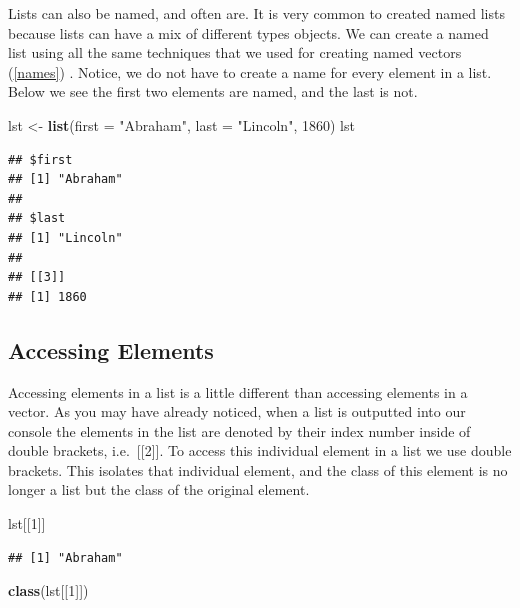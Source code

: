 \documentclass[
]{book}
\newenvironment{Shaded}{\begin{snugshade}}{\end{snugshade}}
\newcommand{\DataTypeTok}[1]{\textcolor[rgb]{0.13,0.29,0.53}{#1}}
\newcommand{\DecValTok}[1]{\textcolor[rgb]{0.00,0.00,0.81}{#1}}
\newcommand{\KeywordTok}[1]{\textcolor[rgb]{0.13,0.29,0.53}{\textbf{#1}}}
\newcommand{\NormalTok}[1]{#1}
\newcommand{\StringTok}[1]{\textcolor[rgb]{0.31,0.60,0.02}{#1}}
\begin{document}
Lists can also be named, and often are. It is very common to created named lists because lists can have a mix of different types objects. We can create a named list using all the same techniques that we used for creating named vectors (\ref{names}) . Notice, we do not have to create a name for every element in a list. Below we see the first two elements are named, and the last is not.

\begin{Shaded}
\begin{Highlighting}[]
\NormalTok{lst <-}\StringTok{ }\KeywordTok{list}\NormalTok{(}\DataTypeTok{first =} \StringTok{"Abraham"}\NormalTok{,}
    \DataTypeTok{last =} \StringTok{"Lincoln"}\NormalTok{,}
    \DecValTok{1860}\NormalTok{)}
\NormalTok{lst}
\end{Highlighting}
\end{Shaded}

\begin{verbatim}
## $first
## [1] "Abraham"
## 
## $last
## [1] "Lincoln"
## 
## [[3]]
## [1] 1860
\end{verbatim}

\hypertarget{accessing-elements-1}{%
\subsection{Accessing Elements}\label{accessing-elements-1}}

Accessing elements in a list is a little different than accessing elements in a vector. As you may have already noticed, when a list is outputted into our console the elements in the list are denoted by their index number inside of double brackets, i.e.~{[}{[}2{]}{]}. To access this individual element in a list we use double brackets. This isolates that individual element, and the class of this element is no longer a list but the class of the original element.

\begin{Shaded}
\begin{Highlighting}[]
\NormalTok{lst[[}\DecValTok{1}\NormalTok{]]}
\end{Highlighting}
\end{Shaded}

\begin{verbatim}
## [1] "Abraham"
\end{verbatim}

\begin{Shaded}
\begin{Highlighting}[]
\KeywordTok{class}\NormalTok{(lst[[}\DecValTok{1}\NormalTok{]])}
\end{Highlighting}
\end{Shaded}
\end{document}
